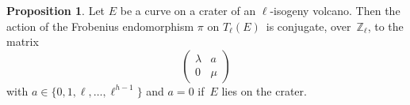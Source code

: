 \documentclass[10pt,a4paper]{beamer}
\theoremstyle{plain}
\theoremstyle{definition}
\theoremstyle{definition}
\theoremstyle{definition}
\newtheorem{prop}[thm]{Proposition}
\theoremstyle{definition}
\theoremstyle{remark}
\theoremstyle{remark}
\begin{document}
\begin{frame}
\begin{columns}
\begin{column}{6cm}
{\begin{figure}[h]
\begin{center}
	\end{center}
\end{figure}}
\end{column}
\end{columns}
\end{frame}

\begin{frame}

\begin{prop}\label{prop:matrice-Frobenius}
Let $E$ be a curve on a crater of an $\ell$-isogeny volcano.
Then the action of the Frobenius endomorphism $\pi$ on $T_\ell(E)$~is conjugate, over~$\mathbb{Z}_\ell$,
to the matrix \[\left ( \begin{matrix}\lambda & a\\ 0 & \mu \end{matrix}\right ) \]  with $a \in \{ 0,1,\ell, \dots, \ell^{h-1}  \}$ and $a = 0$ if~$E$ lies on the crater.

\end{prop}

\begin{figure}
\begin{center}


\end{center}
\end{figure}
\end{frame}
\end{document}
